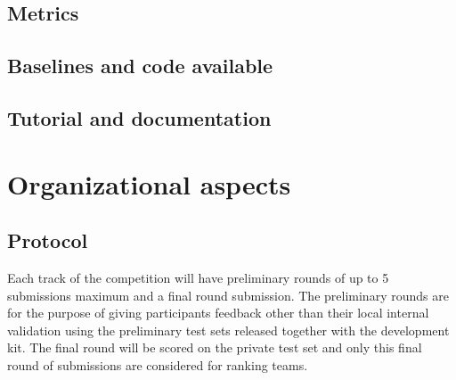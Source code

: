 \documentclass[11pt, oneside]{article}
\begin{document}
\subsection{Metrics}


\subsection{Baselines and code available}


\subsection{Tutorial and documentation}



\section{Organizational aspects}
\subsection{Protocol}


Each track of the competition will have preliminary rounds of up to 5 submissions maximum and a final round submission. The preliminary rounds are for the purpose of giving participants feedback other than their local internal validation using the preliminary test sets released together with the development kit. The final round will be scored on the private test set and only this final round of submissions are considered for ranking teams. 
\end{document}
